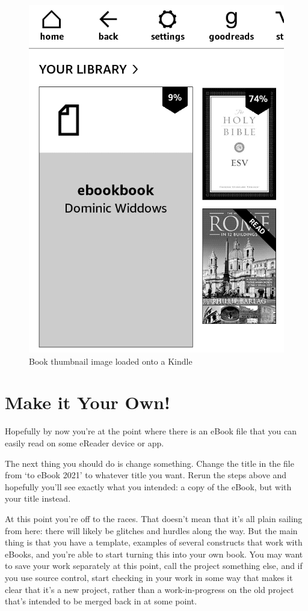 \begin{figure}
  \begin{center}
  \vspace{0.2cm}
  \includegraphics[width=0.6\linewidth]{images/kindle_screenshot.png}
  \vspace{0.4cm}
  \caption{Book thumbnail image loaded onto a Kindle}
  \label{fig:kindle_screenshot}
  \vspace{0.4cm}
 \end{center}
\end{figure}

\section{Make it Your Own!}

Hopefully by now you're at the point where there is an eBook file that you can easily read on some eReader device or app. 

The next thing you should do is change something. Change the title in the  file from `\latex to eBook 2021'
to whatever title you want. Rerun the steps above and hopefully you'll see exactly what you intended: a copy of the eBook, but with
your title instead.

At this point you're off to the races. That doesn't mean that it's all plain sailing from here: there will likely be glitches and hurdles along the way.
But the main thing is that you have a template, examples of several \latex constructs that work with eBooks, and you're able to start turning this
into your own book. You may want to save your work separately at this point, call the project something else, and if you use source control,
start checking in your work in some way that makes it clear that it's a new project, rather than a work-in-progress on the old project that's intended to be
merged back in at some point.

